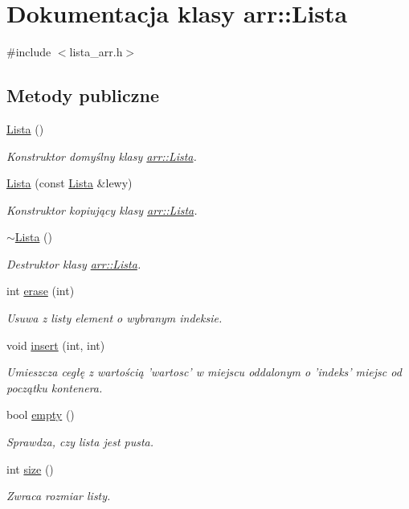 \hypertarget{classarr_1_1_lista}{\section{Dokumentacja klasy arr\-:\-:Lista}
\label{classarr_1_1_lista}
}


{\ttfamily \#include $<$lista\-\_\-arr.\-h$>$}

\subsection*{Metody publiczne}
\begin{DoxyCompactItemize}
\item 
\hyperlink{classarr_1_1_lista_a11b61b647380e962aeeb35848c427b81}{Lista} ()
\begin{DoxyCompactList}\small\item\em Konstruktor domyślny klasy \hyperlink{classarr_1_1_lista}{arr\-::\-Lista}. \end{DoxyCompactList}\item 
\hyperlink{classarr_1_1_lista_a29bae0190a2d5c38ebfdf33eb05d1c09}{Lista} (const \hyperlink{classarr_1_1_lista}{Lista} \&lewy)
\begin{DoxyCompactList}\small\item\em Konstruktor kopiujący klasy \hyperlink{classarr_1_1_lista}{arr\-::\-Lista}. \end{DoxyCompactList}\item 
\hyperlink{classarr_1_1_lista_ac3b5f77b08befbf28e922179dcace594}{$\sim$\-Lista} ()
\begin{DoxyCompactList}\small\item\em Destruktor klasy \hyperlink{classarr_1_1_lista}{arr\-::\-Lista}. \end{DoxyCompactList}\item 
int \hyperlink{classarr_1_1_lista_ad370aa7f4e6bf3f2492f5187c9d64d56}{erase} (int)
\begin{DoxyCompactList}\small\item\em Usuwa z listy element o wybranym indeksie. \end{DoxyCompactList}\item 
void \hyperlink{classarr_1_1_lista_a57365c410ba6ac9d82eb4b4a83bc89bd}{insert} (int, int)
\begin{DoxyCompactList}\small\item\em Umieszcza cegłę z wartością 'wartosc' w miejscu oddalonym o 'indeks' miejsc od początku kontenera. \end{DoxyCompactList}\item 
bool \hyperlink{classarr_1_1_lista_a6eef5db974ccbb5f133a76d22b375ae9}{empty} ()
\begin{DoxyCompactList}\small\item\em Sprawdza, czy lista jest pusta. \end{DoxyCompactList}\item 
int \hyperlink{classarr_1_1_lista_a853418a2061e80c83185f03f0e1568c6}{size} ()
\begin{DoxyCompactList}\small\item\em Zwraca rozmiar listy. \end{DoxyCompactList}\end{DoxyCompactItemize}
